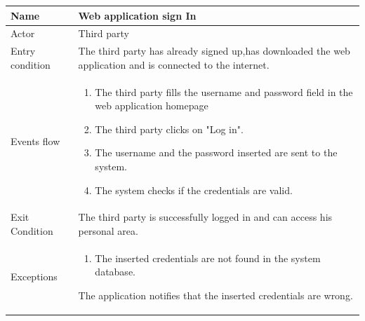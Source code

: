 \begin{table}[p]
\centering
\begin{tabular}{|l|p{11cm}|}
    \hline
    Name & Web application sign In
    \\ \hline
    Actor & Third party
    \\ \hline 
    Entry condition & The third party has already signed up,has downloaded the web application and is connected to the internet.
    \\ \hline
    Events flow &
    \begin{enumerate}
    \item The third party fills the username and password field in the web application homepage
    \item The third party clicks on "Log in".
    \item The username and the password inserted are sent to the system.
    \item The system checks if the credentials are valid.
    \end{enumerate}
     \\ \hline
     Exit Condition & The third party is successfully logged in and can access his personal area.
     \\
    \hline
    Exceptions &
     \begin{enumerate}
    \item The inserted credentials are not found in the system database.  
    \end{enumerate}
   The application notifies that the inserted credentials are wrong.
      \\
    \hline
\end{tabular}
\end{table}


